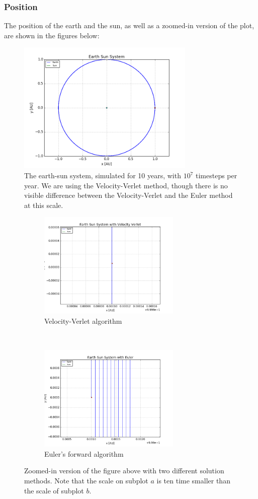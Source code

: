 \documentclass[a4paper, 10pt]{article}
\begin{document}
\subsubsection{Position}
The position of the earth and the sun, as well as a zoomed-in version of the plot, are shown in the figures below:
\begin{figure}[!ht]
    \centering
    \includegraphics[height=2.5in]{earthsun.png}
    \caption{The earth-sun system, simulated for 10 years, with $10^7$ timesteps per year. We are using the Velocity-Verlet method, though there is no visible difference between the Velocity-Verlet and the Euler method at this scale.} \label{fig:earth-sun-figure1}
\end{figure}


\begin{figure}[!ht]
    \centering
    \begin{subfigure}[H!]{0.5\textwidth}
        \centering
        \includegraphics[height=2.0in]{orbitESVV.png}
        \caption{Velocity-Verlet algorithm}
    \end{subfigure}%
    ~ 
    \begin{subfigure}[H!]{0.5\textwidth}
        \centering
        \includegraphics[height=2.0in]{orbitESEuler.png}
        \caption{Euler's forward algorithm}
    \end{subfigure}
    \caption{Zoomed-in version of the figure above with two different solution methods. Note that the scale on subplot $a$ is ten time smaller than the scale of subplot $b$.}
\end{figure}
\end{document}
